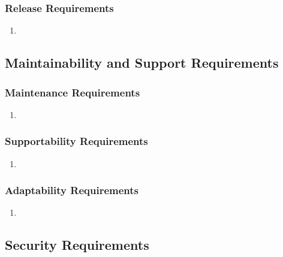 \documentclass[]{article}
\begin{document}
\subsubsection{Release Requirements}
\label{ssub:release_requirements}
\begin{enumerate}[{OE-R}1. ]
	\item
\end{enumerate}


\subsection{Maintainability and Support Requirements}
\label{sub:maintainability_and_support_requirements}

\subsubsection{Maintenance Requirements}
\label{ssub:maintenance_requirements}
\begin{enumerate}[{MS-M}1. ]
	\item
\end{enumerate}

\subsubsection{Supportability Requirements}
\label{ssub:supportability_requirements}
\begin{enumerate}[{MS-S}1. ]
	\item
\end{enumerate}

\subsubsection{Adaptability Requirements}
\label{ssub:adaptability_requirements}
\begin{enumerate}[{MS-A}1. ]
	\item
\end{enumerate}


\subsection{Security Requirements}
\label{sub:security_requirements}
\end{document}
